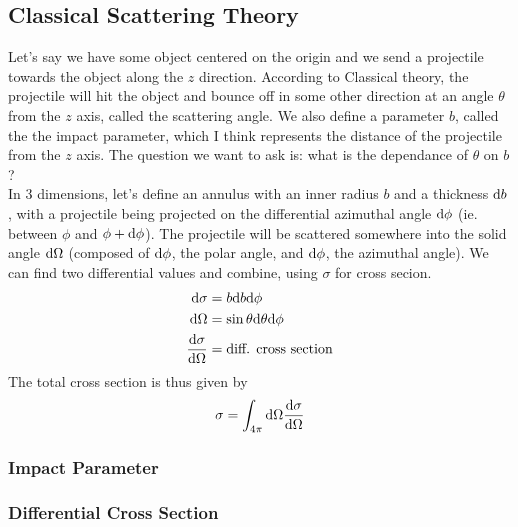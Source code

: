 \documentclass[a4paper]{article}
\begin{document}
\subsection{Classical Scattering Theory}
Let's say we have some object centered on the origin and we send a projectile
towards the object along the $z$ direction. According to Classical theory, the
projectile will hit the object and bounce off in some other direction at an
angle $\theta$ from the $z$ axis, called the scattering angle. We also define
a parameter $b$, called the the impact parameter, which I think represents the
distance of the projectile from the $z$ axis. The question we want to ask
is: what is the dependance of $\theta$ on $b$?\\
In 3 dimensions, let's define an annulus with an inner radius $b$ and a
thickness $\mathrm{d} b$, with a projectile being projected on the differential
azimuthal angle $\mathrm{d}\phi$ (ie. between $\phi$ and $\phi+\mathrm{d}\phi$). The projectile
will be scattered somewhere into the solid angle $\mathrm{d}\Omega$ (composed of
$\mathrm{d}\phi$, the polar angle, and $\mathrm{d}\phi$, the azimuthal angle). We can find two
differential values and combine, using $\sigma$ for cross secion.
\begin{align*}
	\mathrm{d}\sigma &= b\mathrm{d} b\mathrm{d}\phi\\
	\mathrm{d}\Omega &= \sin\theta\mathrm{d}\theta\mathrm{d}\phi\\
	\frac{\mathrm{d} \sigma}{\mathrm{d} \Omega} &= \text{diff. cross section}
\end{align*}
The total cross section is thus given by
\[
	\sigma = \int_{4\pi}\mathrm{d}\Omega\frac{\mathrm{d} \sigma}{\mathrm{d} \Omega}
\]

\begin{eg}
\end{eg}

\subsubsection{Impact Parameter}
\subsubsection{Differential Cross Section}
\end{document}
